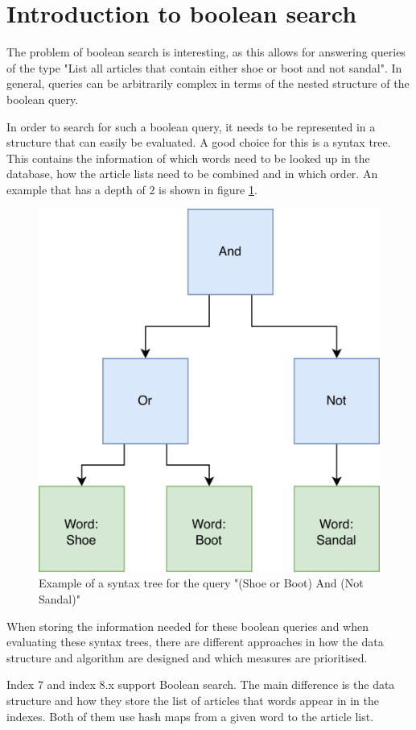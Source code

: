 \section{Introduction to boolean search}

The problem of boolean search is interesting, as this allows for answering queries of the type "List all articles that contain either shoe or boot and not sandal". In general, queries can be arbitrarily complex in terms of the nested structure of the boolean query. 

In order to search for such a boolean query, it needs to be represented in a structure that can easily be evaluated. A good choice for this is a syntax tree. This contains the information of which words need to be looked up in the database, how the article lists need to be combined and in which order. An example that has a depth of 2 is shown in figure \ref{fig:bool-st-example}. 

\begin{figure}[ht!]
    \centering
    \includegraphics[width=.5\textwidth]{LaTeX/Figures/BooleanST.png}
    \caption{Example of a syntax tree for the query "(Shoe or Boot) And (Not Sandal)"}
    \label{fig:bool-st-example}
\end{figure}

When storing the information needed for these boolean queries and when evaluating these syntax trees, there are different approaches in how the data structure and algorithm are designed and which measures are prioritised. 

Index 7 and index 8.x support Boolean search. The main difference is the data structure and how they store the list of articles that words appear in in the indexes. Both of them use hash maps from a given word to the article list. 

